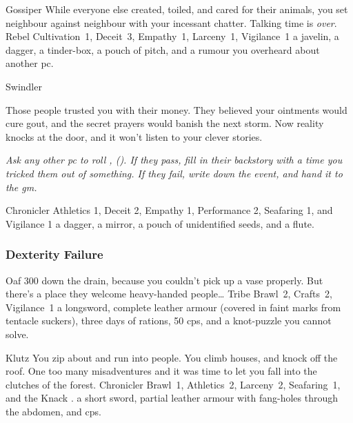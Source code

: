 \begin{multicols}{2}
\begin{itemize}
    {Gossiper}%
    {
      While everyone else created, toiled, and cared for their animals, you set neighbour against neighbour with your incessant chatter.
      Talking time is \emph{over}.
    }%
    {Rebel}%
    {Cultivation~1, Deceit~3, Empathy~1, Larceny~1, Vigilance~1}%
    {a javelin, a dagger, a tinder-box, a pouch of pitch,%
      and a rumour you overheard about another \gls{pc}.}%

    {Swindler}%
    {
      Those people trusted you with their money.
      They believed your ointments would cure gout, and the secret prayers would banish the next storm.
      Now reality knocks at the door, and it won't listen to your clever stories.

      \textit{Ask any other \gls{pc} to roll , (\tn[8]).
      If they pass, fill in their backstory with a time you tricked them out of something.
      If they fail, write down the event, and hand it to the \gls{gm}.}
    }%
    {Chronicler}%
    {Athletics 1, Deceit 2, Empathy 1, Performance 2, Seafaring 1, and Vigilance 1}%
    {
      a dagger, a mirror, a pouch of unidentified seeds, and a flute.
    }%

\end{itemize}

\null


\subsubsection{Dexterity Failure}

\nobreak
\begin{itemize}

    {Oaf}%
    {300  down the drain, because you couldn't pick up a vase properly.
      But there's a place they welcome heavy-handed people\ldots
    }%
    {Tribe}%
    {Brawl~2, Crafts~2, Vigilance~1}%
    {a longsword, complete leather armour (covered in faint marks from tentacle suckers), three days of rations, 50 \glspl{cp}, and a knot-puzzle you cannot solve.}%

    {Klutz}%
    {You zip about and run into people.
      You climb houses, and knock off the roof.
      One too many misadventures and it was time to let you fall into the clutches of the forest.}%
    {Chronicler}%
    {Brawl~1, Athletics~2, Larceny~2, Seafaring~1, and the Knack \charge.}%
    {a short sword, partial leather armour with fang-holes through the abdomen, and  \glspl{cp}.}%


\end{itemize}
\end{multicols}
